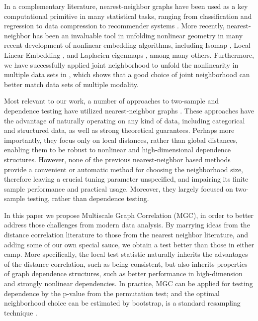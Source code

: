 \documentclass[11pt]{article}
\newcommand{\jv}[1]{{\color{red}{#1}}}
\newcommand{\cs}[1]{{\color{blue}{#1}}}
\begin{document}
In a complementary literature, nearest-neighbor graphs have been used as a key computational primitive in many statistical tasks, ranging from classification and regression \cite{Stone1977} to data compression to recommender systems \cite{Sarwar2000}. 
More recently, nearest-neighbor has been an invaluable tool in unfolding nonlinear geometry in many recent development of nonlinear embedding algorithms, including Isomap \cite{TenenbaumSilvaLangford2000, SilvaTenenbaum2003}, Local Linear Embedding \cite{SaulRoweis2000, RoweisSaul2003}, and Laplacien eigenmaps \cite{BelkinNiyogi2003}, among many others. Furthermore, we have successfully applied joint neighborhood to unfold the nonlinearity in multiple data sets in , which shows that a good choice of joint neighborhood can better match data sets of multiple modality. \jv{rephrase without using the word ``we''}


Most relevant to our work, a number of approaches to two-sample and dependence testing have utilized nearest-neighbor graphs \cite{David1966,Friedman1983,Schilling1986,Dumcke2014}.  These approaches have the advantage of naturally operating on any kind of data, including categorical and structured data, as well as strong theoretical guarantees.  Perhaps more importantly, they focus only on local distances, rather than global distances, enabling them to be robust to nonlinear and high-dimensional dependence structures.  However, none of the previous nearest-neighbor based methods provide a convenient or automatic method for choosing the neighborhood size, therefore leaving a crucial tuning parameter unspecified, and impairing its finite sample performance and practical usage. Moreover, they largely focused on two-sample testing, rather than dependence testing.  


\cs{I am still not sure whether local distance enables robustness to hd dependency, since local dcorr is not robust to hd}
\jv{Fig 8B shows that local $>$ global for all high dimensional settings, and all algorithms, so i think this statement is ok?} 

In this paper we propose Multiscale Graph Correlation (MGC), in order to \jv{never use ``in order to'', always ``to''} better address those challenges from modern data analysis. By marrying ideas from the distance correlation literature to those from the nearest neighbor literature, and adding some of our own special sauce, we obtain a test better than those in either camp.  More specifically,  the local test statistic naturally inherits the advantages of the distance correlation, such as being consistent, but also inherits properties of graph dependence structures, such as better performance in high-dimension and strongly nonlinear dependencies. In practice, MGC can be applied for testing dependence by the p-value from the permutation test; and the optimal neighborhood choice can be estimated by bootstrap,  is a standard resampling technique \cite{EfronTibshiraniBook}.
\end{document}
